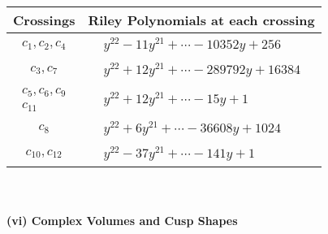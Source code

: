 \documentclass[1p]{elsarticle_modified}
\theoremstyle{definition}
\begin{document}
\begin{tabular}{m{50pt}|m{274pt}}
Crossings & \hspace{64pt}Riley Polynomials at each crossing \\
\hline $$\begin{aligned}c_{1},c_{2},c_{4}\end{aligned}$$&$\begin{aligned}
&y^{22}-11 y^{21}+\cdots-10352 y+256
\end{aligned}$\\
\hline $$\begin{aligned}c_{3},c_{7}\end{aligned}$$&$\begin{aligned}
&y^{22}+12 y^{21}+\cdots-289792 y+16384
\end{aligned}$\\
\hline $$\begin{aligned}c_{5},c_{6},c_{9}\\c_{11}\end{aligned}$$&$\begin{aligned}
&y^{22}+12 y^{21}+\cdots-15 y+1
\end{aligned}$\\
\hline $$\begin{aligned}c_{8}\end{aligned}$$&$\begin{aligned}
&y^{22}+6 y^{21}+\cdots-36608 y+1024
\end{aligned}$\\
\hline $$\begin{aligned}c_{10},c_{12}\end{aligned}$$&$\begin{aligned}
&y^{22}-37 y^{21}+\cdots-141 y+1
\end{aligned}$\\
\hline
\end{tabular}\\~\\
\newpage\flushleft \textbf{(vi) Complex Volumes and Cusp Shapes}
\end{document}
